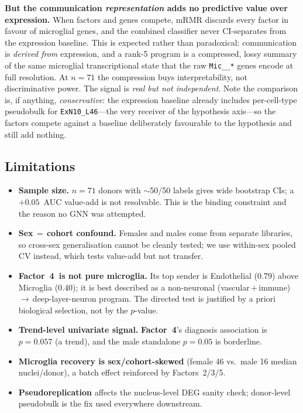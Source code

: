 \documentclass[11pt]{article}
\newcommand{\factorfour}{\textbf{Factor~4}}
\newcommand{\code}[1]{\texttt{\small #1}}
\begin{document}
\textbf{But the communication \emph{representation} adds no predictive value
over expression.} When factors and genes compete, mRMR discards every factor in
favour of microglial genes, and the combined classifier never CI-separates from
the expression baseline. This is expected rather than paradoxical:
communication is \emph{derived from} expression, and a rank-5 program is a
compressed, lossy summary of the same microglial transcriptional state that the
raw \code{Mic\_\_*} genes encode at full resolution. At $n=71$ the compression
buys interpretability, not discriminative power. The signal is \emph{real but
not independent}. Note the comparison is, if anything, \emph{conservative}: the
expression baseline already includes per-cell-type pseudobulk for
\code{ExN10\_L46}---the very receiver of the hypothesis axis---so the factors
compete against a baseline deliberately favourable to the hypothesis and still
add nothing.

\subsection{Limitations}

\begin{itemize}
\item \textbf{Sample size.} $n=71$ donors with $\sim$50/50 labels gives wide
bootstrap CIs; a $+0.05$~AUC value-add is not resolvable. This is the binding
constraint and the reason no GNN was attempted.
\item \textbf{Sex\,$=$\,cohort confound.} Females and males come from separate
libraries, so cross-sex generalisation cannot be cleanly tested; we use within-sex
pooled CV instead, which tests value-add but not transfer.
\item \textbf{\factorfour\ is not pure microglia.} Its top sender is Endothelial
(0.79) above Microglia (0.40); it is best described as a non-neuronal
(vascular\,+\,immune)\,$\rightarrow$\,deep-layer-neuron program. The directed
test is justified by a priori biological selection, not by the $p$-value.
\item \textbf{Trend-level univariate signal.} \factorfour's diagnosis
association is $p=0.057$ (a trend), and the male standalone $p=0.05$ is
borderline.
\item \textbf{Microglia recovery is sex/cohort-skewed} (female 46 vs.\ male 16
median nuclei/donor), a batch effect reinforced by Factors~2/3/5.
\item \textbf{Pseudoreplication} affects the nucleus-level DEG sanity check;
donor-level pseudobulk is the fix used everywhere downstream.
\end{itemize}
\end{document}
